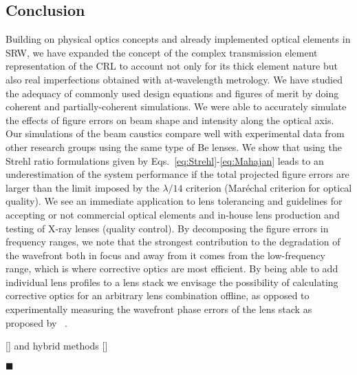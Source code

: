 \begin{refsection}
\chapter{Conclusion}
\label{sec:conclusion}

Building on physical optics concepts and already implemented optical elements in SRW, we have expanded the concept of the complex transmission element representation of the CRL to account not only for its thick element nature but also real imperfections obtained with at-wavelength metrology. We have studied the adequacy of commonly used design equations and figures of merit by doing coherent and partially-coherent simulations. We were able to accurately simulate the effects of figure errors on beam shape and intensity along the optical axis. Our simulations of the beam caustics compare well with experimental data from other research groups using the same type of Be lenses. We show that using the Strehl ratio formulations given by Eqs.~\ref{eq:Strehl}-\ref{eq:Mahajan} leads to an underestimation of the system performance if the total projected figure errors are larger than the limit imposed by the $\lambda/14$ criterion (Mar\'echal criterion for optical quality). We see an immediate application to lens tolerancing and guidelines for accepting or not commercial optical elements and in-house lens production and testing of X-ray lenses (quality control). By decomposing the figure errors in frequency ranges, we note that the strongest contribution to the degradation of the wavefront both in focus and away from it comes from the low-frequency range, which is where corrective optics are most efficient. By being able to add individual lens profiles to a lens stack we envisage the possibility of calculating corrective optics for an arbitrary lens combination offline, as opposed to experimentally measuring the wavefront phase errors of the lens stack as proposed by ~\citeyear{Seiboth2017}. 

[\cite{SanchezdelRio2011}] and hybrid methods [\cite{Shi2014}]

$\blacksquare$
\printbibliography[heading=subbibliography]
\end{refsection}